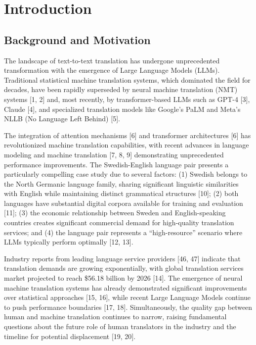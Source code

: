 \documentclass[12pt,a4paper]{article}
\begin{document}

\section{Introduction}

\subsection{Background and Motivation}

The landscape of text-to-text translation has undergone unprecedented
transformation with the emergence of Large Language Models (LLMs).
Traditional statistical machine translation systems, which dominated the
field for decades, have been rapidly superseded by neural machine
translation (NMT) systems {[}1, 2{]} and, most recently, by
transformer-based LLMs such as GPT-4 {[}3{]}, Claude {[}4{]}, and
specialized translation models like Google's PaLM and Meta's NLLB (No
Language Left Behind) {[}5{]}.

The integration of attention mechanisms {[}6{]} and transformer
architectures {[}6{]} has revolutionized machine translation
capabilities, with recent advances in language modeling and machine
translation {[}7, 8, 9{]} demonstrating unprecedented performance
improvements. The Swedish-English language pair presents a particularly
compelling case study due to several factors: (1) Swedish belongs to the
North Germanic language family, sharing significant linguistic
similarities with English while maintaining distinct grammatical
structures {[}10{]}; (2) both languages have substantial digital corpora
available for training and evaluation {[}11{]}; (3) the economic
relationship between Sweden and English-speaking countries creates
significant commercial demand for high-quality translation services; and
(4) the language pair represents a ``high-resource'' scenario where LLMs
typically perform optimally {[}12, 13{]}.

Industry reports from leading language service providers {[}46, 47{]}
indicate that translation demands are growing exponentially, with global
translation services market projected to reach \$56.18 billion by 2026
{[}14{]}. The emergence of neural machine translation systems has
already demonstrated significant improvements over statistical
approaches {[}15, 16{]}, while recent Large Language Models continue to
push performance boundaries {[}17, 18{]}. Simultaneously, the quality
gap between human and machine translation continues to narrow, raising
fundamental questions about the future role of human translators in the
industry and the timeline for potential displacement {[}19, 20{]}.
\end{document}
